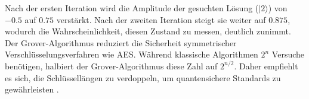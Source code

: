 Nach der ersten Iteration wird die Amplitude der gesuchten Lösung ($|2\rangle$) von $-0.5$ auf $0.75$ verstärkt. 
Nach der zweiten Iteration steigt sie weiter auf $0.875$, wodurch die Wahrscheinlichkeit, diesen Zustand zu messen, deutlich zunimmt.
\\
Der Grover-Algorithmus reduziert die Sicherheit symmetrischer Verschlüsselungsverfahren wie AES. Während klassische 
Algorithmen $2^n$ Versuche benötigen, halbiert der Grover-Algorithmus diese Zahl auf $2^{n/2}$. Daher empfiehlt es sich, die 
Schlüssellängen zu verdoppeln, um quantensichere Standards zu gewährleisten \cite{grover}.

